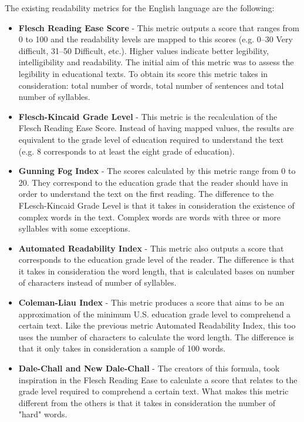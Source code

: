 The existing readability metrics\cite{correia2020evaluation} for the English language are the following:
\begin{itemize}
    \item \textbf{Flesch Reading Ease Score} - This metric outputs a score that ranges from 0 to 100 and the readability levels are mapped to this scores (e.g. 0--30 Very difficult, 31--50 Difficult, etc.).
        Higher values indicate better legibility, intelligibility and readability.
        The initial aim of this metric was to assess the legibility in educational texts.
        To obtain its score this metric takes in consideration: total number of words, total number of sentences and total number of syllables.
    \item \textbf{Flesch-Kincaid Grade Level} - This metric is the recalculation of the Flesch Reading Ease Score.
        Instead of having mapped values, the results are equivalent to the grade level of education required to understand the text (e.g. 8 corresponds to at least the eight grade of education).
    \item \textbf{Gunning Fog Index} - The scores calculated by this metric range from 0 to 20.
        They correspond to the education grade that the reader should have in order to understand the text on the first reading.
        The difference to the FLesch-Kincaid Grade Level is that it takes in consideration the existence of complex words in the text.
        Complex words are words with three or more syllables with some exceptions.
    \item \textbf{Automated Readability Index} - This metric also outputs a score that corresponds to the education grade level of the reader.
        The difference is that it takes in consideration the word length, that is calculated bases on number of characters instead of number of syllables.
    \item \textbf{Coleman-Liau Index} - This metric produces a score that aims to be an approximation of the minimum U.S. education grade level to comprehend a certain text.
        Like the previous metric Automated Readability Index, this too uses the number of characters to calculate the word length.
        The difference is that it only takes in consideration a sample of 100 words.
    \item \textbf{Dale-Chall and New Dale-Chall} - The creators of this formula, took inspiration in the Flesch Reading Ease to calculate a score that relates to the grade level required to comprehend a certain text.
        What makes this metric different from the others is that it takes in consideration the number of "hard" words.

\end{itemize}
